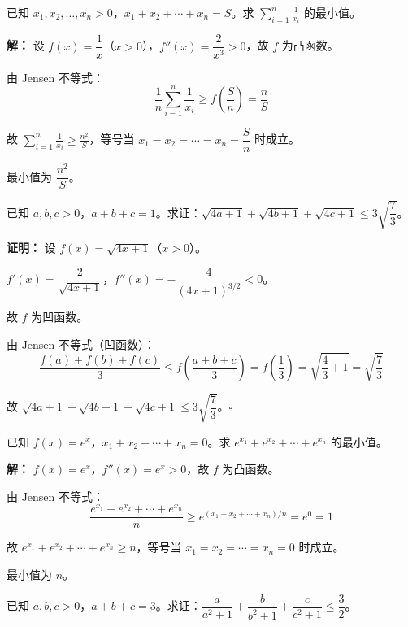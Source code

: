 \documentclass[12pt, a4paper]{ctexart}
\begin{document}
\begin{examplebox}
已知 $x_1, x_2, \ldots, x_n > 0$，$x_1 + x_2 + \cdots + x_n = S$。求 $\displaystyle\sum_{i=1}^n \frac{1}{x_i}$ 的最小值。
\end{examplebox}

\textbf{解：} 设 $f(x) = \dfrac{1}{x}$（$x > 0$），$f''(x) = \dfrac{2}{x^3} > 0$，故 $f$ 为凸函数。

由 Jensen 不等式：
$$\frac{1}{n}\sum_{i=1}^n \frac{1}{x_i} \geq f\!\left(\frac{S}{n}\right) = \frac{n}{S}$$

故 $\displaystyle\sum_{i=1}^n \frac{1}{x_i} \geq \frac{n^2}{S}$，等号当 $x_1 = x_2 = \cdots = x_n = \dfrac{S}{n}$ 时成立。

最小值为 $\boxed{\dfrac{n^2}{S}}$。

\begin{examplebox}
已知 $a, b, c > 0$，$a + b + c = 1$。求证：$\sqrt{4a + 1} + \sqrt{4b + 1} + \sqrt{4c + 1} \leq 3\sqrt{\dfrac{7}{3}}$。
\end{examplebox}

\textbf{证明：} 设 $f(x) = \sqrt{4x + 1}$（$x > 0$）。

$f'(x) = \dfrac{2}{\sqrt{4x + 1}}$，$f''(x) = -\dfrac{4}{(4x + 1)^{3/2}} < 0$。

故 $f$ 为凹函数。

由 Jensen 不等式（凹函数）：
$$\frac{f(a) + f(b) + f(c)}{3} \leq f\!\left(\frac{a + b + c}{3}\right) = f\!\left(\frac{1}{3}\right) = \sqrt{\frac{4}{3} + 1} = \sqrt{\frac{7}{3}}$$

故 $\sqrt{4a + 1} + \sqrt{4b + 1} + \sqrt{4c + 1} \leq 3\sqrt{\dfrac{7}{3}}$。$\square$

\begin{examplebox}
已知 $f(x) = e^x$，$x_1 + x_2 + \cdots + x_n = 0$。求 $e^{x_1} + e^{x_2} + \cdots + e^{x_n}$ 的最小值。
\end{examplebox}

\textbf{解：} $f(x) = e^x$，$f''(x) = e^x > 0$，故 $f$ 为凸函数。

由 Jensen 不等式：
$$\frac{e^{x_1} + e^{x_2} + \cdots + e^{x_n}}{n} \geq e^{(x_1 + x_2 + \cdots + x_n)/n} = e^0 = 1$$

故 $e^{x_1} + e^{x_2} + \cdots + e^{x_n} \geq n$，等号当 $x_1 = x_2 = \cdots = x_n = 0$ 时成立。

最小值为 $\boxed{n}$。

\begin{examplebox}
已知 $a, b, c > 0$，$a + b + c = 3$。求证：$\dfrac{a}{a^2 + 1} + \dfrac{b}{b^2 + 1} + \dfrac{c}{c^2 + 1} \leq \dfrac{3}{2}$。
\end{examplebox}
\end{document}
